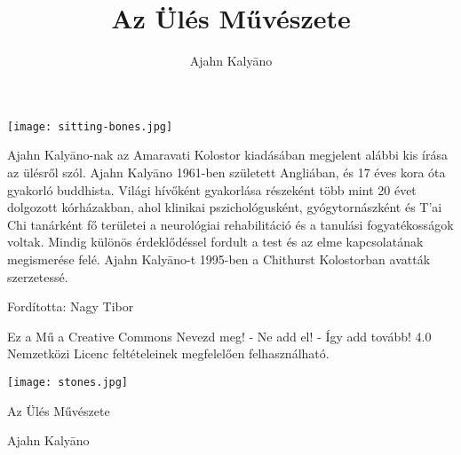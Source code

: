 \documentclass[12pt,oneside,landscape,final]{memoir}
\begin{document}
\title{Az Ülés Művészete}
\author{Ajahn Kalyāno}

\newlength{\foldmarkhoriz}
\setlength{\foldmarkhoriz}{\stockwidth}
\addtolength{\foldmarkhoriz}{-0.5pt}

\AddToShipoutPicture{%
\put(\LenToUnit{\foldmarkhoriz},\LenToUnit{0pt}){%
\color[gray]{0.5}\rule{1pt}{8mm}%
}%
\put(\LenToUnit{\foldmarkhoriz},\LenToUnit{202mm}){%
\color[gray]{0.5}\rule{1pt}{8mm}%
}%
}

\pagestyle{empty}
\setlength{\parindent}{0pt}
\setlength{\parskip}{0.6\baselineskip}

\mbox{}\vfill

{\centering
\texttt{[image: sitting-bones.jpg]}
\par}

\vfill\mbox{}

\clearpage

\mbox{}\vfill

{\centering

Ajahn Kalyāno-nak az Amaravati Kolostor kiadásában megjelent alábbi kis írása az
ülésről szól. Ajahn Kalyāno 1961-ben született Angliában, és 17 éves kora óta
gyakorló buddhista. Világi hívőként gyakorlása részeként több mint 20 évet
dolgozott kórházakban, ahol klinikai pszichológusként, gyógytornászként és T’ai
Chi tanárként fő területei a neurológiai rehabilitáció és a tanulási
fogyatékosságok voltak. Mindig különös érdeklődéssel fordult a test és az elme
kapcsolatának megismerése felé. Ajahn Kalyāno-t 1995-ben a Chithurst Kolostorban
avatták szerzetessé.

\bigskip

Fordította: Nagy Tibor

\bigskip

\ccbyncsa

{\footnotesize
Ez a Mű a Creative Commons Nevezd meg! - Ne add el! - Így add tovább! 4.0 Nemzetközi Licenc feltételeinek megfelelően felhasználható.
}


}

\vfill\mbox{}

\clearpage

\mbox{}\vfill

{\centering
\texttt{[image: stones.jpg]}
\par}

{\centering
{\Huge Az Ülés Művészete}

Ajahn Kalyāno
\par}
\end{document}
